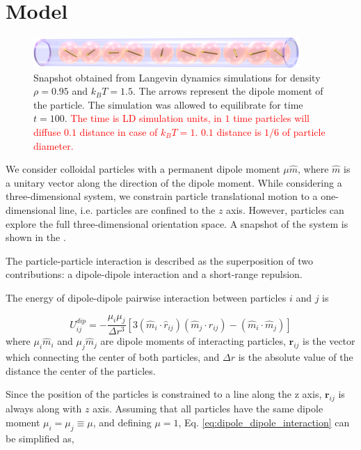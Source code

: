 \section{Model}
\label{sec:model}

\begin{figure}[t]
\centering
	\includegraphics[width=0.9\textwidth]{Images/fullSystemPicture}
	\captionsetup{justification=centering, width=0.9\textwidth}
	\caption{Snapshot obtained from Langevin dynamics simulations for density $\rho = 0.95$ and $k_BT = 1.5$. The arrows represent the dipole moment of the particle. The simulation was allowed to equilibrate for time $t = 100$. \textcolor{red}{The time is LD simulation units, in $1$ time particles will diffuse $0.1$ distance in case of $k_BT = 1$. $0.1$ distance is $1/6$ of particle diameter.}}
	\label{fig:fullSystemPicture}
\end{figure}

We consider colloidal particles with a permanent dipole moment $\mu \hat{m}$, where $\hat{m}$ is a unitary vector along the direction of the dipole moment. While considering a three-dimensional system, we constrain particle translational motion to a one-dimensional line, i.e. particles are confined to the $z$ axis. However, particles can explore the full three-dimensional orientation space. A snapshot of the system is shown in the .

The particle-particle interaction is described as the superposition of two contributions: a dipole-dipole interaction and a short-range repulsion.

The energy of dipole-dipole pairwise interaction between particles $i$ and $j$ is

\begin{equation}
\label{eq:dipole_dipole_interaction}
U^{dip}_{ij} =
	- \frac{\mu_i \mu_j}{\Delta r^3}[
		3 (\hat{m}_i \cdot \hat{r}_{ij})(\hat{m}_j \cdot \hat{r}_{ij})
		- (\hat{m}_i \cdot \hat{m}_j)
	]
\end{equation}
where $\mu_i \hat{m}_i$ and $\mu_j \hat{m}_j$ are dipole moments of interacting particles, $\boldsymbol{r}_{ij}$ is the vector which connecting the center of both particles, and $\Delta r$ is the absolute value of the distance the center of the particles.

Since the position of the particles is constrained to a line along the z axis, $\boldsymbol{r}_{ij}$ is always along with $z$ axis. Assuming that all particles have the same dipole moment $\mu_i = \mu_j \equiv \mu$, and defining $\mu = 1$, Eq. \eqref{eq:dipole_dipole_interaction} can be simplified as,

